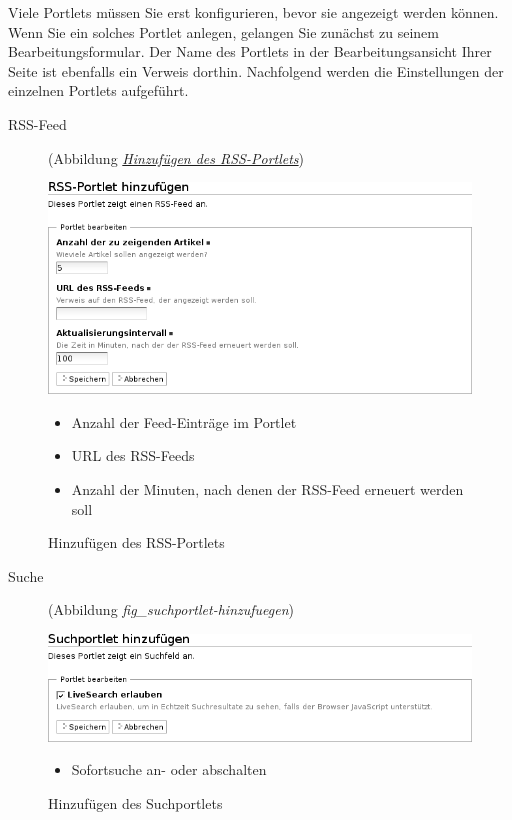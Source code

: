 \documentclass[a4paper,12pt,ngerman]{manual}
\begin{document}
Viele Portlets müssen Sie erst konfigurieren, bevor sie angezeigt werden
können. Wenn Sie ein solches Portlet anlegen, gelangen Sie zunächst zu seinem
Bearbeitungsformular. Der Name des Portlets in der Bearbeitungsansicht Ihrer
Seite ist ebenfalls ein Verweis dorthin. Nachfolgend werden die Einstellungen
der einzelnen Portlets aufgeführt.
\begin{description}
\item[RSS-Feed] \leavevmode
(Abbildung \hyperlink{fig-rss-feed-hinzufuegen}{\emph{Hinzufügen des RSS-Portlets}})

\end{description}
\hypertarget{fig-rss-feed-hinzufuegen}{}\begin{figure}[htbp]
\centering

\includegraphics{rss-feed-portlet-hinzufuegen.png}
\caption{Hinzufügen des RSS-Portlets}{\small \begin{itemize}
\item {} 
Anzahl der Feed-Einträge im Portlet

\item {} 
URL des RSS-Feeds

\item {} 
Anzahl der Minuten, nach denen der RSS-Feed erneuert werden soll

\end{itemize}
}\end{figure}
\begin{description}
\item[Suche] \leavevmode
(Abbildung \emph{fig\_suchportlet-hinzufuegen})

\end{description}
\begin{figure}[htbp]
\centering

\includegraphics{suchportlet-hinzufuegen.png}
\caption{Hinzufügen des Suchportlets}{\small \begin{itemize}
\item {} 
Sofortsuche an- oder abschalten

\end{itemize}
}\end{figure}
\end{document}
